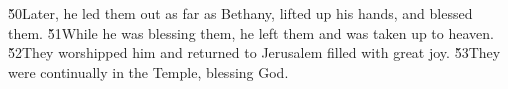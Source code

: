 \v{50}Later, he led them out as far as Bethany, lifted up his hands, and blessed them. \v{51}While he was blessing them, he left them and was taken up to heaven. \v{52}They worshipped him and returned to Jerusalem filled with great joy. \v{53}They were continually in the Temple, blessing God.
